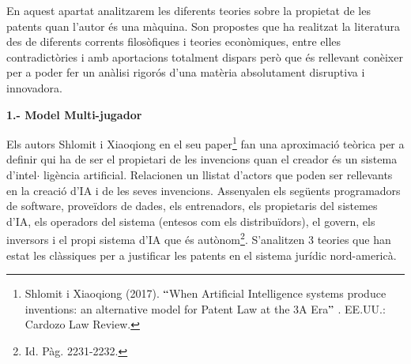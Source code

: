 \documentclass[12pt]{article}
\begin{document}
\vspace{\baselineskip}
\begin{justify}
En aquest apartat analitzarem les diferents teories sobre la propietat de les patents quan l’autor és una màquina. Son propostes que ha realitzat la literatura des de diferents corrents filosòfiques i teories econòmiques, entre elles contradictòries i amb aportacions totalment dispars però que és rellevant conèixer per a poder fer un anàlisi rigorós d’una matèria absolutament disruptiva i innovadora. 
\end{justify}\par


\vspace{\baselineskip}
\begin{justify}
\textbf{1.- Model Multi-jugador }
\end{justify}\par


\vspace{\baselineskip}
\begin{justify}
Els autors Shlomit i Xiaoqiong en el seu paper\footnote{ Shlomit i Xiaoqiong (2017). $``$When Artificial Intelligence systems produce inventions: an alternative model for Patent Law at the 3A Era$"$ . EE.UU.: Cardozo Law Review.  } fan una aproximació teòrica per a definir qui ha de ser el propietari de les invencions quan el creador és un sistema d’intel$ \cdot $ ligència artificial. Relacionen un llistat d’actors que poden ser rellevants en la creació d’IA i de les seves invencions. Assenyalen els següents programadors de software, proveïdors de dades, els entrenadors, els propietaris del sistemes d’IA, els operadors del sistema (entesos com els distribuïdors), el govern, els inversors i el propi sistema d’IA que és autònom\footnote{ Id. Pàg. 2231-2232. }. S’analitzen 3 teories que han estat les clàssiques per a justificar les patents en el sistema jurídic nord-americà. 
\end{justify}\par
\end{document}
